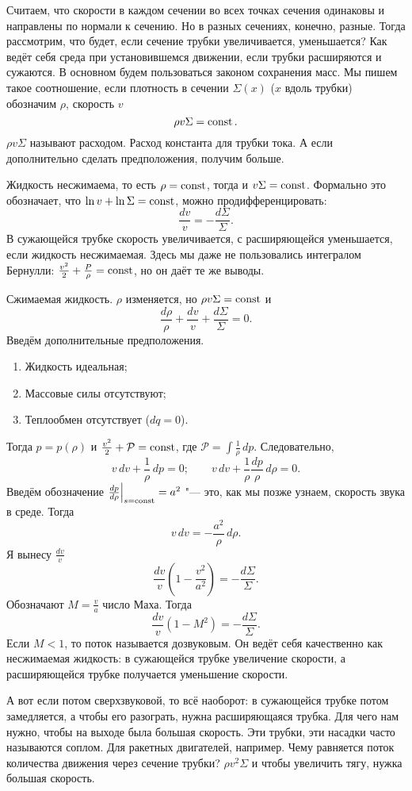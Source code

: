 Считаем, что скорости в каждом сечении во всех точках сечения одинаковы и направлены по нормали к сечению. Но в разных сечениях, конечно, разные. Тогда рассмотрим, что будет, если сечение трубки увеличивается, уменьшается? Как ведёт себя среда при установившемся движении, если трубки расширяются и сужаются. В основном будем пользоваться законом сохранения масс. Мы пишем такое соотношение, если плотность в сечении $\Sigma(x)$ ($x$ вдоль трубки) обозначим $\rho$, скорость $v$
 \[
   \rho v\Sigma = \operatorname{const}.
 \]
$\rho v\Sigma$ называют расходом. Расход константа для трубки тока. А если дополнительно сделать предположения, получим больше.
\begin{roItems}
  \item Жидкость несжимаема, то есть $\rho =\operatorname{const}$, тогда и $v\Sigma = \operatorname{const}$. Формально это обозначает, что $\ln v + \ln\Sigma = \operatorname{const}$, можно продифференцировать:
\[
  \frac{dv}{v} = -\frac{d\Sigma}{\Sigma}.
\]
В сужающейся трубке скорость увеличивается, с расширяющейся уменьшается, если жидкость несжимаемая.
Здесь мы даже не пользовались интегралом Бернулли: $\frac{v^2}2+\frac{P}\rho = \operatorname{const}$, но он даёт те же выводы.

\item Сжимаемая жидкость. $\rho$ изменяется, но $\rho v\Sigma=\operatorname{const}$ и
\[
   \frac{d\rho}{\rho} + \frac{dv}{v}+\frac{d\Sigma}{\Sigma}=0.
\]
Введём дополнительные предположения.
\begin{enumerate}
  \item Жидкость идеальная;
  \item Массовые силы отсутствуют;
  \item Теплообмен отсутствует ($dq=0$).
\end{enumerate}
Тогда $p = p(\rho)$ и $\frac{v^2}2+\mathcal P=\operatorname{const}$, где $\mathcal P = \int\frac1\rho\,dp$. Следовательно,
\[
  v\,dv+\frac1\rho\,dp = 0;\qquad v\,dv+\frac1\rho\frac{dp}{\rho}\,d\rho=0.
\]
Введём обозначение $\frac{dp}{d\rho}\Big|_{s=\operatorname{const}} = a^2$ "--- это, как мы позже узнаем, скорость звука в среде. Тогда
\[
  v\,dv = -\frac{a^2}\rho\,d\rho.
\]
Я вынесу $\frac{dv}{v}$
\[
  \frac{dv}{v}\left(1-\frac{v^2}{a^2}\right) = -\frac{d\Sigma}{\Sigma}.
\]
Обозначают $M=\frac{v}a$ число Маха. Тогда
\[
  \frac{dv}{v}(1-M^2) = -\frac{d\Sigma}{\Sigma}.
\]
Если $M<1$, то поток называется дозвуковым. Он ведёт себя качественно как несжимаемая жидкость: в сужающейся трубке увеличение скорости, а расширяющейся трубке получается уменьшение скорости.

А вот если потом сверхзвуковой, то всё наоборот: в сужающейся трубке потом замедляется, а чтобы его разограть, нужна расширяющаяся трубка. Для чего нам нужно, чтобы на выходе была большая скорость. Эти трубки, эти насадки часто называются соплом. Для ракетных двигателей, например.
Чему равняется поток количества движения через сечение трубки? $\rho v^2 \Sigma$ и чтобы увеличить тягу, нужка большая скорость.


\end{roItems}
